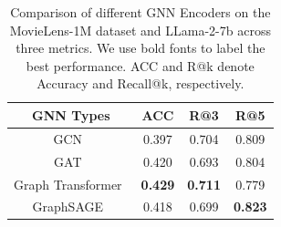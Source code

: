 \begin{table}[t]
  \centering
  \caption{ 
   Comparison of different GNN Encoders on the MovieLens-1M dataset and LLama-2-7b across three metrics. We use bold fonts to label the best performance. ACC and R@k denote Accuracy and Recall@k, respectively.}
  \vskip -0.05in
    \scalebox{0.75}
{
    \begin{tabular}{c|c|c|c}
    \toprule
    \toprule
    \multirow{1}{*}{GNN Types}  & \multirow{1}{*}{ACC} & \multirow{1}{*}{R@3} &\multirow{1}{*}{R@5}  \\
    \midrule
    GCN~\citep{kipf2016semi} & 0.397 & 0.704 & 0.809 \\
    GAT~\citep{velickovic2017graph}  & 0.420 & 0.693 & 0.804 \\
    Graph Transformer~\citep{shi2020masked} & \textbf{0.429} & \textbf{0.711} &0.779 \\
    GraphSAGE~\citep{hamilton2017inductive} &0.418  &0.699  &\textbf{0.823} \\
    \bottomrule
    \bottomrule
    \end{tabular}%
}
  \label{tab:gnn}%
  \vskip -0.06in
\end{table}%